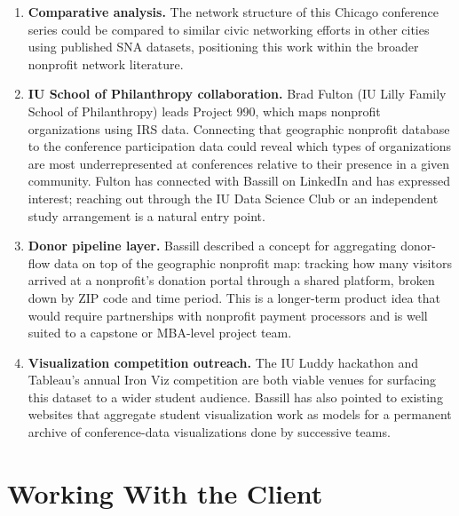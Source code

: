 \documentclass[12pt]{article}
\begin{document}
\begin{enumerate}[leftmargin=1.5em]
  \item \textbf{Comparative analysis.}
        The network structure of this Chicago conference series could be
        compared to similar civic networking efforts in other cities using
        published SNA datasets, positioning this work within the broader
        nonprofit network literature.

  \item \textbf{IU School of Philanthropy collaboration.}
        Brad Fulton (IU Lilly Family School of Philanthropy) leads Project 990,
        which maps nonprofit organizations using IRS data. Connecting that
        geographic nonprofit database to the conference participation data
        could reveal which types of organizations are most underrepresented
        at conferences relative to their presence in a given community.
        Fulton has connected with Bassill on LinkedIn and has expressed
        interest; reaching out through the IU Data Science Club or an
        independent study arrangement is a natural entry point.

  \item \textbf{Donor pipeline layer.}
        Bassill described a concept for aggregating donor-flow data on top of
        the geographic nonprofit map: tracking how many visitors arrived at
        a nonprofit's donation portal through a shared platform, broken down
        by ZIP code and time period. This is a longer-term product idea that
        would require partnerships with nonprofit payment processors and is
        well suited to a capstone or MBA-level project team.

  \item \textbf{Visualization competition outreach.}
        The IU Luddy hackathon and Tableau's annual Iron Viz competition are
        both viable venues for surfacing this dataset to a wider student
        audience. Bassill has also pointed to existing websites that aggregate
        student visualization work as models for a permanent archive of
        conference-data visualizations done by successive teams.
\end{enumerate}

\section{Working With the Client}
\end{document}
